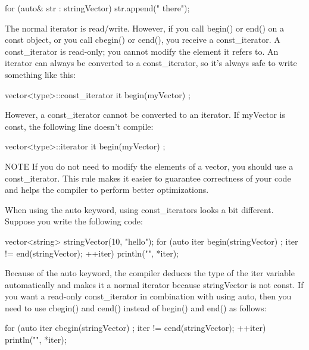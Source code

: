 \begin{cpp}
for (auto& str : stringVector) {
    str.append(" there");
}
\end{cpp}


The normal iterator is read/write. However, if you call begin() or end() on a const object, or you call cbegin() or cend(), you receive a const\_iterator. A const\_iterator is read-only; you cannot modify the element it refers to. An iterator can always be converted to a const\_iterator, so it’s always safe to write something like this:

\begin{cpp}
vector<type>::const_iterator it { begin(myVector) };
\end{cpp}

However, a const\_iterator cannot be converted to an iterator. If myVector is const, the following line doesn’t compile:

\begin{cpp}
vector<type>::iterator it { begin(myVector) };
\end{cpp}

\begin{myNotic}{NOTE}
If you do not need to modify the elements of a vector, you should use a const\_iterator. This rule makes it easier to guarantee correctness of your code and helps the compiler to perform better optimizations.
\end{myNotic}

When using the auto keyword, using const\_iterators looks a bit different. Suppose you write the following code:

\begin{cpp}
vector<string> stringVector(10, "hello");
for (auto iter { begin(stringVector) }; iter != end(stringVector); ++iter) {
    println("{}", *iter);
}
\end{cpp}

Because of the auto keyword, the compiler deduces the type of the iter variable automatically and makes it a normal iterator because stringVector is not const. If you want a read-only const\_iterator in combination with using auto, then you need to use cbegin() and cend() instead of begin() and end() as follows:

\begin{cpp}
for (auto iter { cbegin(stringVector) }; iter != cend(stringVector); ++iter) {
    println("{}", *iter);
}
\end{cpp}

